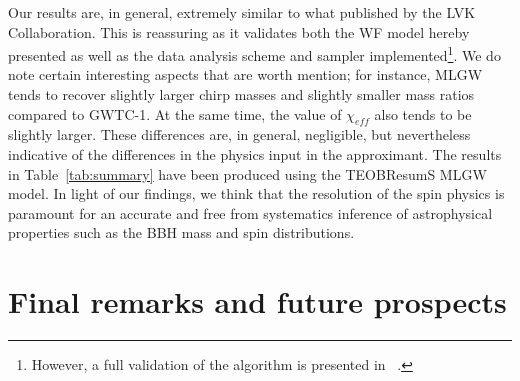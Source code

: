 Our results are, in general, extremely similar to what published by the LVK Collaboration. 
This is reassuring as it validates both the WF model hereby presented as well as the data analysis scheme and sampler implemented\footnote{However, a full validation of the algorithm is presented in ~\cite{}.}.
We do note certain interesting aspects that are worth mention; for instance, MLGW tends to recover slightly larger chirp masses and slightly 
smaller mass ratios compared to GWTC-1. At the same  time, the value of $\chi_{eff}$ also tends to be slightly larger. 
These differences are, in general, negligible, but nevertheless indicative of the differences in the physics input in the approximant. 
The results in Table~\ref{tab:summary} have been produced using the TEOBResumS MLGW model. 
In light of our findings, we think that the resolution of the spin physics is paramount for an accurate and free from 
systematics inference of astrophysical properties such as the BBH mass and spin distributions.

\section{Final remarks and future prospects}
\label{sec:end}


